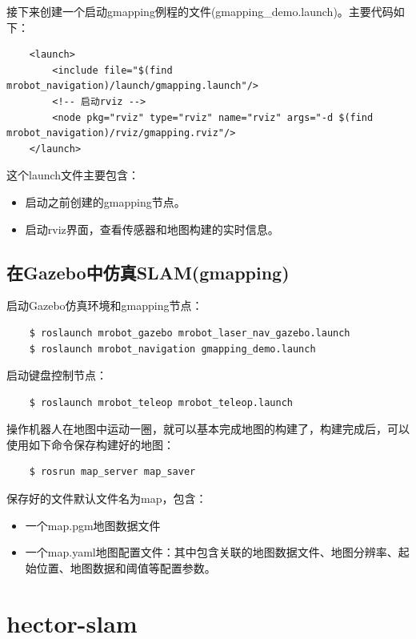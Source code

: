\documentclass[10pt, oneside]{book}
\begin{document}
接下来创建一个启动gmapping例程的文件(gmapping\_demo.launch)。主要代码如下：

\begin{verbatim}
    <launch>
        <include file="$(find mrobot_navigation)/launch/gmapping.launch"/>
        <!-- 启动rviz -->
        <node pkg="rviz" type="rviz" name="rviz" args="-d $(find mrobot_navigation)/rviz/gmapping.rviz"/>
    </launch>
\end{verbatim}

这个launch文件主要包含：

\begin{itemize}
    \item 启动之前创建的gmapping节点。
    \item 启动rviz界面，查看传感器和地图构建的实时信息。
\end{itemize}

\subsection{在Gazebo中仿真SLAM(gmapping)}

启动Gazebo仿真环境和gmapping节点：

\begin{verbatim}
    $ roslaunch mrobot_gazebo mrobot_laser_nav_gazebo.launch
    $ roslaunch mrobot_navigation gmapping_demo.launch
\end{verbatim}

启动键盘控制节点：

\begin{verbatim}
    $ roslaunch mrobot_teleop mrobot_teleop.launch
\end{verbatim}

操作机器人在地图中运动一圈，就可以基本完成地图的构建了，构建完成后，可以使用如下命令保存构建好的地图：

\begin{verbatim}
    $ rosrun map_server map_saver
\end{verbatim}

保存好的文件默认文件名为map，包含：
\begin{itemize}
    \item 一个map.pgm地图数据文件
    \item 一个map.yaml地图配置文件：其中包含关联的地图数据文件、地图分辨率、起始位置、地图数据和阈值等配置参数。
\end{itemize}

\section{hector-slam}
\end{document}
